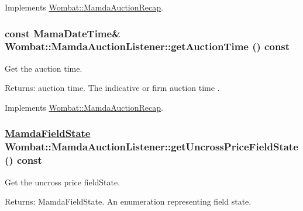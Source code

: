 Implements \hyperlink{classWombat_1_1MamdaAuctionRecap_867a8e076b348cc2492faeb251886cc1}{Wombat::Mamda\-Auction\-Recap}.\hypertarget{classWombat_1_1MamdaAuctionListener_65c25c4e3840fd5a70fff6495cccc0c4}{
\subsubsection[getAuctionTime]{\setlength{\rightskip}{0pt plus 5cm}const Mama\-Date\-Time\& Wombat::Mamda\-Auction\-Listener::get\-Auction\-Time () const}}
\label{classWombat_1_1MamdaAuctionListener_65c25c4e3840fd5a70fff6495cccc0c4}


Get the auction time. 

\begin{Desc}
\item[Returns:]auction time. The indicative or firm auction time . \end{Desc}


Implements \hyperlink{classWombat_1_1MamdaAuctionRecap_29766366c4a151a36917987874e63d90}{Wombat::Mamda\-Auction\-Recap}.\hypertarget{classWombat_1_1MamdaAuctionListener_be7081fdcfdb4f70ad917fe12b6ad2ce}{
\subsubsection[getUncrossPriceFieldState]{\setlength{\rightskip}{0pt plus 5cm}\hyperlink{namespaceWombat_93aac974f2ab713554fd12a1fa3b7d2a}{Mamda\-Field\-State} Wombat::Mamda\-Auction\-Listener::get\-Uncross\-Price\-Field\-State () const}}
\label{classWombat_1_1MamdaAuctionListener_be7081fdcfdb4f70ad917fe12b6ad2ce}


Get the uncross price field\-State. 

\begin{Desc}
\item[Returns:]Mamda\-Field\-State. An enumeration representing field state. \end{Desc}


